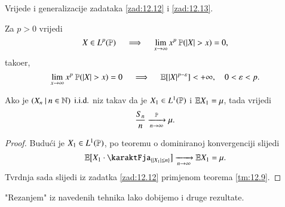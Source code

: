 \begin{nap} \label{nap:12.13-1}
    Vrijede i generalizacije zadataka \ref{zad:12.12} i \ref{zad:12.13}.

    Za $p > 0$ vrijedi
    \begin{equation*}
        X  \in L^p (\mathbb{P}) \quad \implies \quad \lim\limits_{x \to \infty} x^p \: \mathbb{P} (|X| > x) = 0,
    \end{equation*}
    tako\dj er,
    \begin{equation*}
        \lim\limits_{x \to \infty} x^p \: \mathbb{P} (|X| > x) = 0 \quad \implies \quad \mathbb{E} [ |X|^{p-\varepsilon} ] < +\infty, \quad 0 < \varepsilon < p.
    \end{equation*}
\end{nap}

\begin{kor} \label{kor:12.14}
    Ako je $({X_n} \: | \: {n \in \mathbb{N}})$ $\mathrm{i.i.d.}$ niz takav da je $X_1 \in L^1(\mathbb{P})$ i $\mathbb{E} X_1 = \mu$, tada vrijedi
    \begin{equation*}
        \frac{S_n}{n} \xrightarrow[n \to \infty]{\mathbb{P}} \mu.
    \end{equation*}
\end{kor}

\begin{proof}
    Budu\' ci je $X_1 \in L^1(\mathbb{P})$, po teoremu o dominiranoj konvergenciji slijedi
    \begin{equation*}
        \masE \big[ X_1 \cdot \karaktFja_{\{ |X_1| \leq n \}} \big] \xrightarrow[n \to \infty]{} \masE X_1 = \mu.
    \end{equation*}
    Tvrdnja sada slijedi iz zadatka \ref{zad:12.12} primjenom teorema \ref{tm:12.9}.
\end{proof}

"Rezanjem" iz navedenih tehnika lako dobijemo i druge rezultate.


